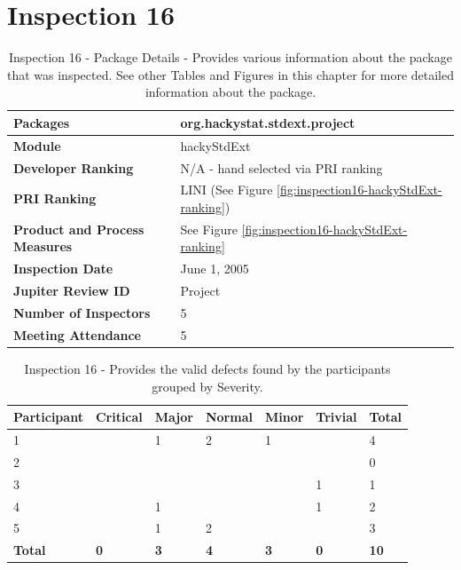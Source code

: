 \section{Inspection 16}
\label{appendix:section:inspection16}

\begin{table}[!h]
  \begin{center}
    \caption[Inspection 16 - Package Details]{Inspection 16 - Package Details 
      - Provides various information about the package that was
      inspected. See other Tables and Figures in this chapter for more
      detailed information about the package.}
    \label{tab:inspection-package-details-16}
    \begin{tabular}{|p{5.0cm}|p{8.0cm}|} \hline
{\bf Packages} & org.hackystat.stdext.project \\ \hline
{\bf Module} & hackyStdExt \\ \hline
{\bf Developer Ranking} & N/A - hand selected via PRI ranking \\ \hline
{\bf PRI Ranking} & LINI (See Figure \ref{fig:inspection16-hackyStdExt-ranking}) \\ \hline
{\bf Product and Process Measures} & See Figure \ref{fig:inspection16-hackyStdExt-ranking} \\ \hline
{\bf Inspection Date} & June 1, 2005 \\ \hline
{\bf Jupiter Review ID} & Project \\ \hline
{\bf Number of Inspectors} & 5 \\ \hline
{\bf Meeting Attendance} & 5 \\ \hline
    \end{tabular}
  \end{center}
\end{table}

\begin{table}[!h]
  \begin{center}
    \caption[Inspection 16 - Results by Severity]{Inspection 16
      - Provides the valid defects found by the participants grouped by
      Severity.}
    \label{tab:inspection-results-16}
    \begin{tabular}{|p{2.0cm}|p{1.5cm}|p{1.5cm}|p{1.5cm}|p{1.5cm}|p{1.5cm}|p{1.5cm}|} \hline
{\bf Participant} & {\bf Critical} & {\bf Major} 
& {\bf Normal} & {\bf Minor} & {\bf Trivial} & {\bf Total} \\ \hline
1 &   & 1 & 2 & 1 &   & 4 \\ \hline
2 &   &   &   &   &   & 0 \\ \hline
3 &   &   &   &   & 1 & 1 \\ \hline
4 &   & 1 &   &   & 1 & 2 \\ \hline
5 &   & 1 & 2 &   &   & 3 \\ \hline
{\bf Total} & {\bf 0} & {\bf 3} & {\bf 4} & {\bf 3} & {\bf 0} & {\bf 10} \\ \hline
    \end{tabular}
  \end{center}
\end{table}

